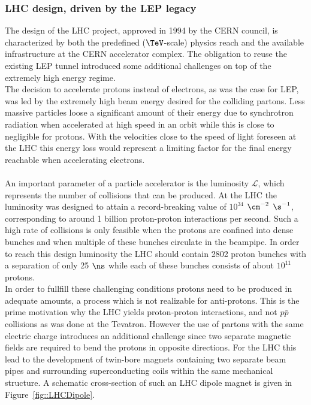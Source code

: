 \subsubsection{LHC design, driven by the LEP legacy}
The design of the LHC project, approved in 1994 by the CERN council, is characterized by both the predefined ($\TeV$-scale) physics reach and the available infrastructure at the CERN accelerator complex.
The obligation to reuse the existing LEP tunnel introduced some additional challenges on top of the extremely high energy regime. 
\\
The decision to accelerate protons instead of electrons, as was the case for LEP, was led by the extremely high beam energy desired for the colliding partons. Less massive particles loose a significant amount of their energy due to synchrotron radiation when accelerated at high speed in an orbit while this is close to negligible for protons. With the velocities close to the speed of light foreseen at the LHC this energy loss would represent a limiting factor for the final energy reachable when accelerating electrons.
\\
\\
An important parameter of a particle accelerator is the luminosity $\mathcal{L}$, which represents the number of collisions that can be produced.
At the LHC the luminosity was designed to attain a record-breaking value of $10^{34}$ $\cm^{-2}$ $\s^{-1}$, corresponding to around 1 billion proton-proton interactions per second. Such a high rate of collisions is only feasible when the protons are confined into dense bunches and when multiple of these bunches circulate in the beampipe.
In order to reach this design luminosity the LHC should contain 2802 proton bunches with a separation of only 25 $\ns$ while each of these bunches consists of about $10^{11}$ protons.
\\
In order to fullfill these challenging conditions protons need to be produced in adequate amounts, a process which is not realizable for anti-protons. This is the prime motivation why the LHC yields proton-proton interactions, and not $p\bar{p}$ collisions as was done at the Tevatron.
However the use of partons with the same electric charge introduces an additional challenge since two separate magnetic fields are required to bend the protons in opposite directions. For the LHC this lead to the development of twin-bore magnets containing two separate beam pipes and surrounding superconducting coils within the same mechanical structure. A schematic cross-section of such an LHC dipole magnet is given in Figure~\ref{fig::LHCDipole}.
